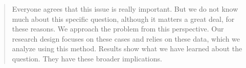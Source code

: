 
 \label{00abstract}
\vspace{-0.5cm}
\begin{quote}
	Everyone agrees that this issue is really important. But we do not
	know much about this specific question, although it matters a great
	deal, for these reasons. We approach the problem from this
	perspective. Our research design focuses on these cases and relies
	on these data, which we analyze using this method. Results show what
	we have learned about the question. They have these broader
	implications.
	
\end{quote}









\newpage
\clearpage
\singlespacing
\printbibliography

